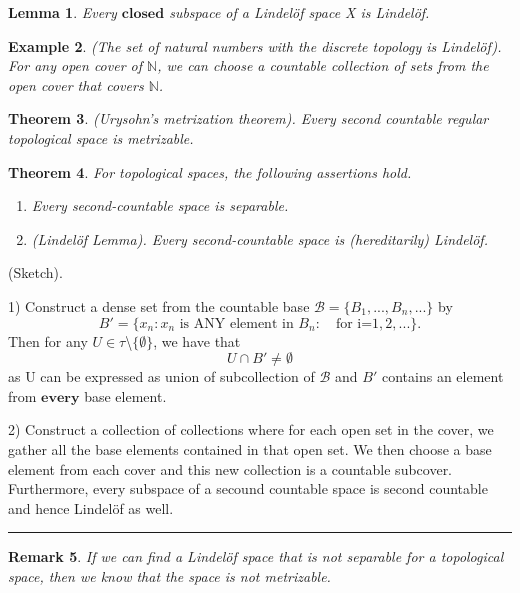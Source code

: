 \documentclass[twoside]{article}
\newcounter{lecnum}
\newtheorem{theorem}{Theorem}[lecnum]
\newtheorem{lemma}[theorem]{Lemma}
\newtheorem{remark}[theorem]{Remark}
\newtheorem{example}[theorem]{Example}
\newenvironment{proof}{{\bf Proof:}}{\hfill\rule{2mm}{2mm}}
\begin{document}
\begin{lemma} Every $\textbf{closed}$ subspace of a Lindelöf space X is Lindelöf.
\end{lemma}

\begin{example}(The set of natural numbers with the discrete topology is Lindelöf). For any open cover of $\mathbb{N}$, we can choose a countable collection of sets from the open cover that covers $\mathbb{N}$.
\end{example}

\begin{theorem}(Urysohn's metrization theorem). Every second countable regular topological space is metrizable.
\end{theorem}

\begin{theorem}For topological spaces, the following assertions hold.
\begin{enumerate}
\item Every second-countable space is separable.
\item (Lindelöf Lemma). Every second-countable space is (hereditarily) Lindelöf.
\end{enumerate}
\end{theorem}

\begin{proof}(Sketch).

1) Construct a dense set from the countable base $\mathcal{B} = \{B_1,...,B_n,...\}$ by 
$$
B' = \{x_n: x_n \text{ is ANY element in }B_n: \quad \text{for i=}1,2,... \}.
$$
Then for any $U \in \tau$\textbackslash $\{\emptyset\}$, we have that
$$
U \cap B' \neq \emptyset
$$
as U can be expressed as union of subcollection of $\mathcal{B}$ and $B'$ contains an element from $\textbf{every}$ base element.
\newline

2) Construct a collection of collections where for each open set in the cover, we gather all the base elements contained in that open set. We then choose a base element from each cover and this new collection is a countable subcover. Furthermore, every subspace of a secound countable space is second countable and hence Lindelöf as well.
\end{proof}

\begin{remark}If we can find a Lindelöf space that is not separable for a topological space, then we know that the space is not metrizable.
\end{remark}
\end{document}

